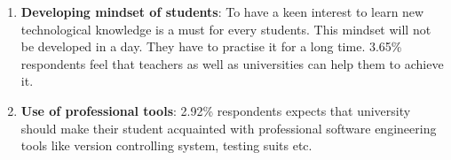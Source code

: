 \begin{enumerate}
    
    
    \item \textbf{Developing mindset of students}: To have a keen interest to learn new technological knowledge is a must for every students. This mindset will not be developed in a day. They have to practise it for a long time. 3.65\% respondents feel that teachers as well as universities can help them to achieve it.
    
    
    
    \item \textbf{Use of professional tools}: 2.92\% respondents expects that university should make their student acquainted with professional software engineering tools like version controlling system, testing suits etc.
    
\end{enumerate}